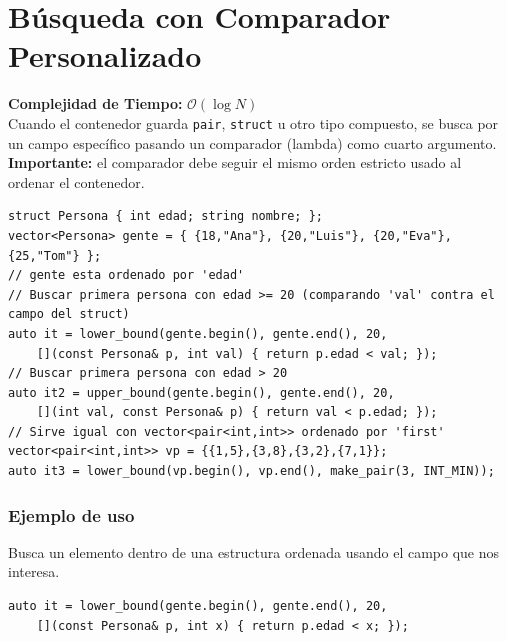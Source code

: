 \documentclass[10pt,twocolumn,letterpaper]{report}
\begin{document}
\section{Búsqueda con Comparador Personalizado}
\textbf{Complejidad de Tiempo:} $\mathcal{O}(\log N)$ \\
Cuando el contenedor guarda \texttt{pair}, \texttt{struct} u otro tipo compuesto, se busca por un campo específico pasando un comparador (lambda) como cuarto argumento. \textbf{Importante:} el comparador debe seguir el mismo orden estricto usado al ordenar el contenedor.
\begin{lstlisting}
struct Persona { int edad; string nombre; };
vector<Persona> gente = { {18,"Ana"}, {20,"Luis"}, {20,"Eva"}, {25,"Tom"} };
// gente esta ordenado por 'edad'
// Buscar primera persona con edad >= 20 (comparando 'val' contra el campo del struct)
auto it = lower_bound(gente.begin(), gente.end(), 20,
    [](const Persona& p, int val) { return p.edad < val; });
// Buscar primera persona con edad > 20
auto it2 = upper_bound(gente.begin(), gente.end(), 20,
    [](int val, const Persona& p) { return val < p.edad; });
// Sirve igual con vector<pair<int,int>> ordenado por 'first'
vector<pair<int,int>> vp = {{1,5},{3,8},{3,2},{7,1}};
auto it3 = lower_bound(vp.begin(), vp.end(), make_pair(3, INT_MIN));
\end{lstlisting}
\subsubsection*{Ejemplo de uso}
Busca un elemento dentro de una estructura ordenada usando el campo que nos interesa.
\begin{lstlisting}
auto it = lower_bound(gente.begin(), gente.end(), 20,
    [](const Persona& p, int x) { return p.edad < x; });
\end{lstlisting}
\end{document}
